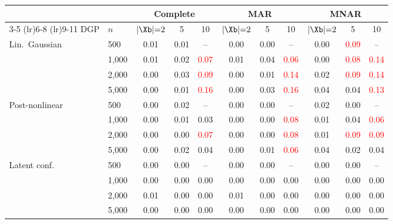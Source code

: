 \begin{tabular}{llccccccccc}
    \toprule
     & & \multicolumn{3}{c}{Complete} & \multicolumn{3}{c}{MAR} & \multicolumn{3}{c}{MNAR} \\
    \cmidrule(lr){3-5} \cmidrule(lr){6-8} \cmidrule(lr){9-11}
    DGP & $n$ & $|\Xb|{=}2$ & 5 & 10 & $|\Xb|{=}2$ & 5 & 10 & $|\Xb|{=}2$ & 5 & 10 \\
    \midrule
    Lin.\ Gaussian   & 500 & 0.01 & 0.01 & -- & 0.00 & 0.00 & -- & 0.00 & \textcolor{red}{0.09} & -- \\
                     & 1,000 & 0.01 & 0.02 & \textcolor{red}{0.07} & 0.01 & 0.04 & \textcolor{red}{0.06} & 0.00 & \textcolor{red}{0.08} & \textcolor{red}{0.14} \\
                     & 2,000 & 0.00 & 0.03 & \textcolor{red}{0.09} & 0.00 & 0.01 & \textcolor{red}{0.14} & 0.02 & \textcolor{red}{0.09} & \textcolor{red}{0.14} \\
                     & 5,000 & 0.00 & 0.01 & \textcolor{red}{0.16} & 0.00 & 0.03 & \textcolor{red}{0.16} & 0.04 & 0.04 & \textcolor{red}{0.13} \\
    \midrule
    Post-nonlinear   & 500 & 0.00 & 0.02 & -- & 0.00 & 0.00 & -- & 0.02 & 0.00 & -- \\
                     & 1,000 & 0.00 & 0.01 & 0.03 & 0.00 & 0.00 & \textcolor{red}{0.08} & 0.01 & 0.04 & \textcolor{red}{0.06} \\
                     & 2,000 & 0.00 & 0.00 & \textcolor{red}{0.07} & 0.00 & 0.00 & \textcolor{red}{0.08} & 0.01 & \textcolor{red}{0.09} & \textcolor{red}{0.09} \\
                     & 5,000 & 0.00 & 0.02 & 0.04 & 0.00 & 0.01 & \textcolor{red}{0.06} & 0.04 & 0.02 & 0.04 \\
    \midrule
    Latent conf.     & 500 & 0.00 & 0.00 & -- & 0.00 & 0.00 & -- & 0.00 & 0.00 & -- \\
                     & 1,000 & 0.00 & 0.00 & 0.00 & 0.00 & 0.00 & 0.00 & 0.00 & 0.00 & 0.00 \\
                     & 2,000 & 0.01 & 0.00 & 0.00 & 0.01 & 0.00 & 0.00 & 0.00 & 0.00 & 0.00 \\
                     & 5,000 & 0.00 & 0.00 & 0.00 & 0.00 & 0.00 & 0.00 & 0.00 & 0.00 & 0.00 \\
    \bottomrule
\end{tabular}
